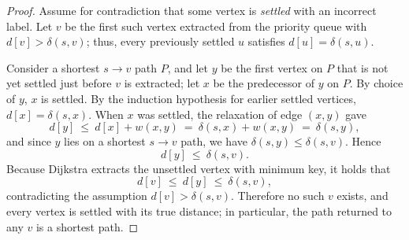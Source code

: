 \documentclass[11pt]{article}
\theoremstyle{definition}
\theoremstyle{remark}
\begin{document}
\begin{proof}
Assume for contradiction that some vertex is \emph{settled} with an incorrect label. 
Let $v$ be the first such vertex extracted from the priority queue with $d[v]>\delta(s,v)$;
 thus, every previously settled $u$ satisfies $d[u]=\delta(s,u)$.

Consider a shortest $s\!\to\! v$ path $P$, and let $y$ be the first vertex on $P$ that is not yet settled just before $v$ is extracted; let $x$ be the predecessor of $y$ on $P$. By choice of $y$, $x$ is settled. By the induction hypothesis for earlier settled vertices, $d[x]=\delta(s,x)$. When $x$ was settled, the relaxation of edge $(x,y)$ gave
\[
d[y]\ \le\ d[x]+w(x,y)\ =\ \delta(s,x)+w(x,y)\ =\ \delta(s,y),
\]
and since $y$ lies on a shortest $s\!\to\! v$ path, we have $\delta(s,y)\le \delta(s,v)$. Hence
\[
d[y]\ \le\ \delta(s,v).
\]
Because Dijkstra extracts the unsettled vertex with minimum key, it holds that
\[
d[v]\ \le\ d[y]\ \le\ \delta(s,v),
\]
contradicting the assumption $d[v]>\delta(s,v)$. Therefore no such $v$ exists, and every vertex is settled with its true distance; in particular, the path returned to any $v$ is a shortest path.
\end{proof}
\end{document}
